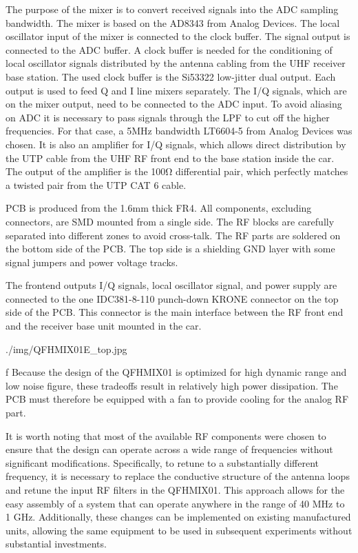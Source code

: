 The purpose of the mixer is to convert received signals into the ADC sampling bandwidth. The mixer is based on the AD8343 from Analog Devices. The local oscillator input of the mixer is connected to the clock buffer. The signal output is connected to the ADC buffer.
A clock buffer is needed for the conditioning of local oscillator signals distributed by the antenna cabling from the UHF receiver base station.  The used clock buffer is the Si53322 low-jitter dual output. Each output is used to feed Q and I line mixers separately. 
The I/Q signals, which are on the mixer output, need to be connected to the ADC input. To avoid aliasing on ADC it is necessary to pass signals through the LPF to cut off the higher frequencies. For that case, a 5MHz bandwidth LT6604-5 from Analog Devices was chosen. It is also an amplifier for I/Q signals, which allows direct distribution by the UTP cable from the UHF RF front end to the base station inside the car. The output of the amplifier is the 100Ω differential pair, which perfectly matches a twisted pair from the UTP CAT 6 cable.

PCB is produced from the 1.6mm thick FR4. All components, excluding connectors, are SMD mounted from a single side. The RF blocks are carefully separated into different zones to avoid cross-talk. The RF parts are soldered on the bottom side of the PCB. The top side is a shielding GND layer with some signal jumpers and power voltage tracks.

The frontend outputs I/Q signals, local oscillator signal, and power supply are connected to the one IDC381-8-110 punch-down KRONE connector on the top side of the PCB. This connector is the main interface between the RF front end and the receiver base unit mounted in the car. 

\medskip
{}
\picw=10cm \cinspic ./img/QFHMIX01E_top.jpg
\caption/f  Because the design of the QFHMIX01 is optimized for high dynamic range and low noise figure, these tradeoffs result in relatively high power dissipation. The PCB must therefore be equipped with a fan to provide cooling for the analog RF part.
\medskip

It is worth noting that most of the available RF components were chosen to ensure that the design can operate across a wide range of frequencies without significant modifications. Specifically, to retune to a substantially different frequency, it is necessary to replace the conductive structure of the antenna loops and retune the input RF filters in the QFHMIX01. This approach allows for the easy assembly of a system that can operate anywhere in the range of 40 MHz to 1 GHz. Additionally, these changes can be implemented on existing manufactured units, allowing the same equipment to be used in subsequent experiments without substantial investments.


